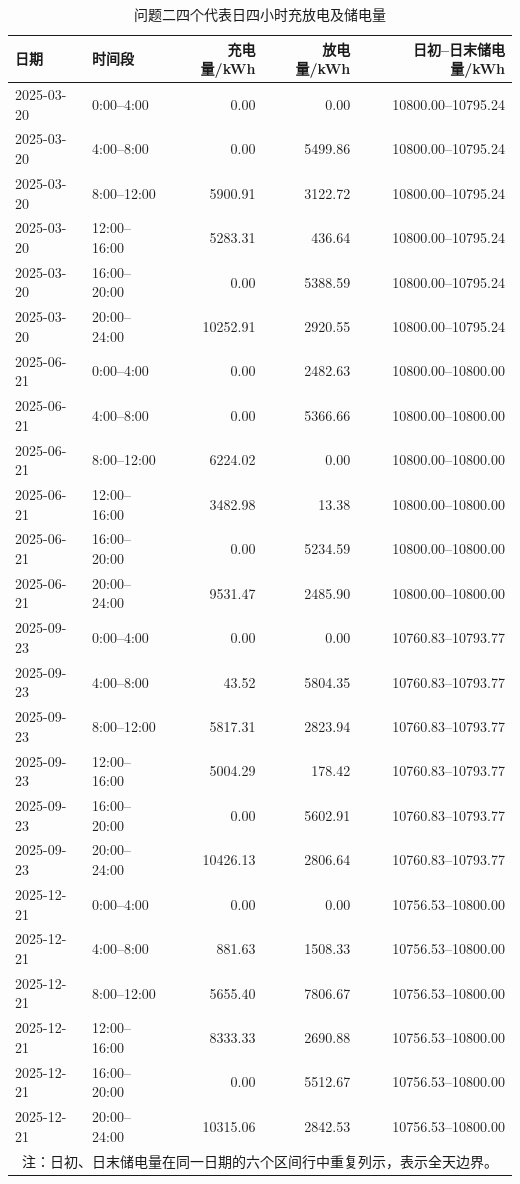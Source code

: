 \documentclass[UTF8,12pt,a4paper]{ctexart}
\theoremstyle{remark}
\begin{document}
\begin{table}[htbp]\centering\scriptsize
\caption{问题二四个代表日四小时充放电及储电量}\label{tab:q2-blocks}
\begin{tabular}{llrrr}\toprule 日期&时间段&充电量/kWh&放电量/kWh&日初--日末储电量/kWh\\\midrule
2025-03-20&0:00--4:00&0.00&0.00&10800.00--10795.24\\
2025-03-20&4:00--8:00&0.00&5499.86&10800.00--10795.24\\
2025-03-20&8:00--12:00&5900.91&3122.72&10800.00--10795.24\\
2025-03-20&12:00--16:00&5283.31&436.64&10800.00--10795.24\\
2025-03-20&16:00--20:00&0.00&5388.59&10800.00--10795.24\\
2025-03-20&20:00--24:00&10252.91&2920.55&10800.00--10795.24\\
2025-06-21&0:00--4:00&0.00&2482.63&10800.00--10800.00\\
2025-06-21&4:00--8:00&0.00&5366.66&10800.00--10800.00\\
2025-06-21&8:00--12:00&6224.02&0.00&10800.00--10800.00\\
2025-06-21&12:00--16:00&3482.98&13.38&10800.00--10800.00\\
2025-06-21&16:00--20:00&0.00&5234.59&10800.00--10800.00\\
2025-06-21&20:00--24:00&9531.47&2485.90&10800.00--10800.00\\
2025-09-23&0:00--4:00&0.00&0.00&10760.83--10793.77\\
2025-09-23&4:00--8:00&43.52&5804.35&10760.83--10793.77\\
2025-09-23&8:00--12:00&5817.31&2823.94&10760.83--10793.77\\
2025-09-23&12:00--16:00&5004.29&178.42&10760.83--10793.77\\
2025-09-23&16:00--20:00&0.00&5602.91&10760.83--10793.77\\
2025-09-23&20:00--24:00&10426.13&2806.64&10760.83--10793.77\\
2025-12-21&0:00--4:00&0.00&0.00&10756.53--10800.00\\
2025-12-21&4:00--8:00&881.63&1508.33&10756.53--10800.00\\
2025-12-21&8:00--12:00&5655.40&7806.67&10756.53--10800.00\\
2025-12-21&12:00--16:00&8333.33&2690.88&10756.53--10800.00\\
2025-12-21&16:00--20:00&0.00&5512.67&10756.53--10800.00\\
2025-12-21&20:00--24:00&10315.06&2842.53&10756.53--10800.00\\\bottomrule
\multicolumn{5}{c}{注：日初、日末储电量在同一日期的六个区间行中重复列示，表示全天边界。}\end{tabular}\end{table}
\end{document}
